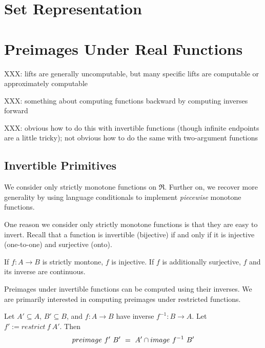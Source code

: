 
\DeclarePairedDelimiter{\ivl}{[\mspace{-4.5mu}(}{)\mspace{-4.5mu}]}

\section{Set Representation}


\section{Preimages Under Real Functions}

\newcommand{\cl}[1]{\overline{\vphantom{i}{#1}}}
\newcommand{\sub}[1]{_{_{#1}}}

XXX: lifts are generally uncomputable, but many specific lifts are computable or approximately computable

XXX: something about computing functions backward by computing inverses forward

XXX: obvious how to do this with invertible functions (though infinite endpoints are a little tricky); not obvious how to do the same with two-argument functions

\subsection{Invertible Primitives}

We consider only strictly monotone functions on $\Re$.
Further on, we recover more generality by using language conditionals to implement \emph{piecewise} monotone functions.

One reason we consider only strictly monotone functions is that they are easy to invert.
Recall that a function is invertible (bijective) if and only if it is injective (one-to-one) and surjective (onto).

\begin{lemma}
\label{lem:monotone-implies-invertible}
If $f : A \to B$ is strictly montone, $f$ is injective.
If $f$ is additionally surjective, $f$ and its inverse are continuous.
\end{lemma}

Preimages under invertible functions can be computed using their inverses.
We are primarily interested in computing preimages under restricted functions.

\begin{lemma}
\label{lem:invertible-function-preimages}
Let $A' \subseteq A$, $B' \subseteq B$, and $f : A \to B$ have inverse $f^{-1} : B \to A$.
Let $f' := restrict~f~A'$. Then
\begin{equation}
	preimage~f'~B'\ =\ A' \cap image~f^{-1}~B'
\end{equation}
\end{lemma}

